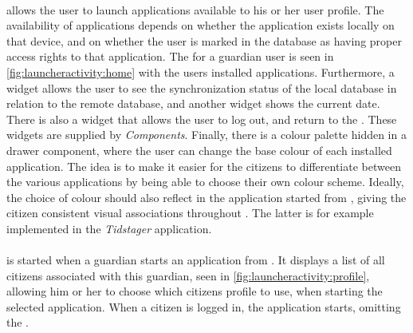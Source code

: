 \paragraph{\homeactivity} allows the user to launch \giraf applications available to his or her user profile. 
The availability of applications depends on whether the application exists locally on that device, and on whether the user is marked in the database as having proper access rights to that application.
The \homeactivity for a guardian user is seen in \cref{fig:launcheractivity:home} with the users installed \giraf applications.
Furthermore, a widget allows the user to see the synchronization status of the local database in relation to the remote database, and another widget shows the current date. 
There is also a widget that allows the user to log out, and return to the \authenticationactivity.
These widgets are supplied by \textit{\giraf Components}.
Finally, there is a colour palette hidden in a drawer component, where the user can change the base colour of each installed application.
The idea is to make it easier for the citizens to differentiate between the various applications by being able to choose their own colour scheme. 
Ideally, the choice of colour should also reflect in the application started from \launcher, giving the citizen consistent visual associations throughout \giraf.
The latter is for example implemented in the \textit{Tidstager} application.

\paragraph{\profileselectionactivity} is started when a guardian starts an application from \launcher. 
It displays a list of all citizens associated with this guardian, seen in \cref{fig:launcheractivity:profile}, allowing him or her to choose which citizens profile to use, when starting the selected application. 
When a citizen is logged in, the application starts, omitting the \profileselectionactivity.